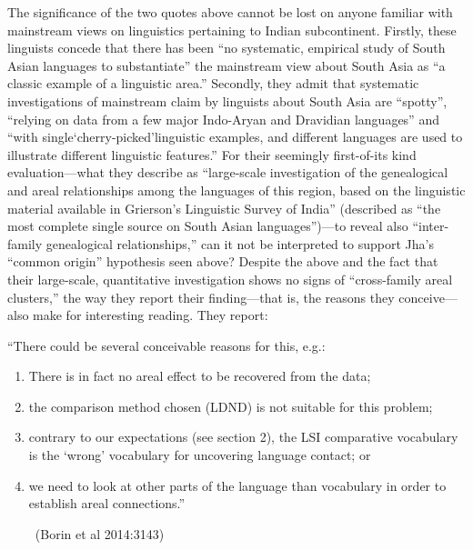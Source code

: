 The significance of the two quotes above cannot be lost on anyone familiar with mainstream views on linguistics pertaining to Indian subcontinent. Firstly, these linguists concede that there has been “no systematic, empirical study of South Asian languages to substantiate” the mainstream view about South Asia as “a classic example of a linguistic area.” Secondly, they admit that systematic investigations of mainstream claim by linguists about South Asia are “spotty”, “relying on data from a few major Indo-Aryan and Dravidian languages” and “with single‘cherry-picked’linguistic examples, and different languages are used to illustrate different linguistic features.” For their seemingly first-of-its kind evaluation—what they describe as “large-scale investigation of the genealogical and areal relationships among the languages of this region, based on the linguistic material available in Grierson’s Linguistic Survey of India” (described as “the most complete single source on South Asian languages”)—to reveal also “inter-family genealogical relationships,” can it not be interpreted to support Jha’s “common origin” hypothesis seen above? Despite the above and the fact that their large-scale, quantitative investigation shows no signs of “cross-family areal clusters,” the way they report their finding—that is, the reasons they conceive—also make for interesting reading. They report:

\begin{myquote}
“There could be several conceivable reasons for this, e.g.:
\end{myquote}

\begin{enumerate}
\item There is in fact no areal effect to be recovered from the data;

 \item the comparison method chosen (LDND) is not suitable for this problem;

 \item contrary to our expectations (see section 2), the LSI comparative vocabulary is the ‘wrong’ vocabulary for uncovering language contact; or
 
 \item we need to look at other parts of the language than vocabulary in order to establish areal connections.”

~\hfill (Borin et al 2014:3143)

\end{enumerate}

